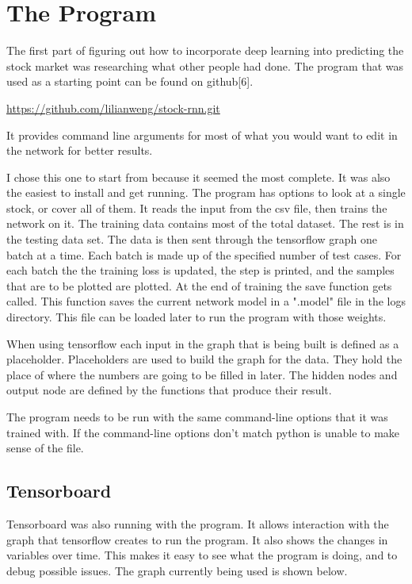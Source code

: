 \documentclass{article}
\begin{document}
\section{The Program}
The first part of figuring out how to incorporate deep learning into predicting the stock market was researching what other people had done.
The program that was used as a starting point can be found on github[6]. 
\begin{center} \url{https://github.com/lilianweng/stock-rnn.git} \end{center}
It provides command line arguments for most of what you would want to edit in the network for better results.

I chose this one to start from because it seemed the most complete.
It was also the easiest to install and get running.
The program has options to look at a single stock, or cover all of them.
It reads the input from the csv file, then trains the network on it. 
The training data contains most of the total dataset.
The rest is in the testing data set.
The data is then sent through the tensorflow graph one batch at a time. 
Each batch is made up of the specified number of test cases. 
For each batch the the training loss is updated, the step is printed, and the samples that are to be plotted are plotted.
At the end of training the save function gets called.
This function saves the current network model in a ".model" file in the logs directory.
This file can be loaded later to run the program with those weights.

When using tensorflow each input in the graph that is being built is defined as a placeholder.
Placeholders are used to build the graph for the data.
They hold the place of where the numbers are going to be filled in later.
The hidden nodes and output node are defined by the functions that produce their result.

The program needs to be run with the same command-line options that it was trained with.
If the command-line options don't match python is unable to make sense of the file.

\subsection{Tensorboard}
Tensorboard was also running with the program. It allows interaction with the graph that tensorflow creates to run the program. It also shows the changes in variables over time. This makes it easy to see what the program is doing, and to debug possible issues. The graph currently being used is shown below.
\end{document}
